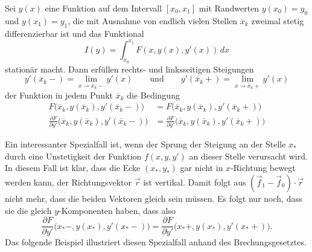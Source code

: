 \begin{satz}
\label{buch:nichtdiff:splines:satz:weierstrass-erdmann}
Sei $y(x)$ eine Funktion auf dem Intervall $[x_0,x_1]$ mit Randwerten
$y(x_0)=y_0$ und $y(x_1)=y_1$, die mit Ausnahme von endlich
vielen Stellen $\overline{x}_k$ zweimal
stetig differenzierbar ist und das Funktional
\[
I(y)
=
\int_{x_0}^{x_1}
F(x,y(x),y'(x))
\,dx
\]
stationär macht.
Dann erfüllen rechts- und linksseitigen Steigungen
\[
y'(\overline{x}_k-) = \lim_{x\to \overline{x}_k-} y'(x)
\qquad\text{und}\qquad
y'(\overline{x}_k+) = \lim_{x\to \overline{x}_k+} y'(x)
\]
der Funktion in jedem Punkt $\overline{x}_k$ die Bedingung
\begin{equation}
\begin{aligned}
F\bigl(
\overline{x}_k,
y(\overline{x}_k),
y'(\overline{x}_k-)
\bigr)
&=
F\bigl(
\overline{x}_k,
y(\overline{x}_k),
y'(\overline{x}_k+)
\bigr)
\\
\frac{\partial F}{\partial y'}\bigl(
\overline{x}_k,
y(\overline{x}_k),
y'(\overline{x}_k-)
\bigr)
&=
\frac{\partial F}{\partial y'}\bigl(
\overline{x}_k,
y(\overline{x}_k),
y'(\overline{x}_k+)
\bigr)
\end{aligned}
\label{buch:nichtdiff:eckenedingung:eqn:we}
\end{equation}
\end{satz}

Ein interessanter Spezialfall ist, wenn der Sprung der Steigung
an der Stelle $x_*$ durch eine Unstetigkeit der Funktion $f(x,y,y')$
an dieser Stelle verursacht wird.
In diesem Fall ist klar, dass die Ecke $(x_*,y_*)$ gar nicht in
$x$-Richtung bewegt werden kann, der Richtungsvektor $\vec{r}$ ist
vertikal.
Damit folgt aus $(\vec{f}_1-\vec{f}_0)\cdot\vec{r}$ nicht mehr,
dass die beiden Vektoren gleich sein müssen.
Es folgt nur noch, dass sie die gleich $y$-Komponenten haben,
dass also
\begin{equation}
\frac{\partial F}{\partial y'}\bigl(x_*-,y(x_*),y'(x_*-)\bigr)
=
\frac{\partial F}{\partial y'}\bigl(x_*+,y(x_*),y'(x_*+)\bigr).
\label{buch:nichtdiff:eckenbedingung:eqn:we0}
\end{equation}
Das folgende Beispiel illustriert diesen Spezialfall anhand des
Brechungsgesetztes.

